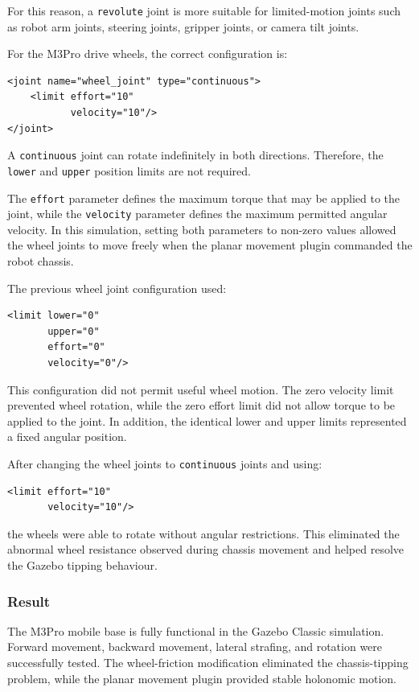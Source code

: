 \documentclass{article}
\begin{document}
For this reason, a \texttt{revolute} joint is more suitable for limited-motion joints such as robot arm joints, steering joints, gripper joints, or camera tilt joints.

For the M3Pro drive wheels, the correct configuration is:

\begin{verbatim}
<joint name="wheel_joint" type="continuous">
    <limit effort="10"
           velocity="10"/>
</joint>
\end{verbatim}

A \texttt{continuous} joint can rotate indefinitely in both directions. Therefore, the \texttt{lower} and \texttt{upper} position limits are not required.

The \texttt{effort} parameter defines the maximum torque that may be applied to the joint, while the \texttt{velocity} parameter defines the maximum permitted angular velocity. In this simulation, setting both parameters to non-zero values allowed the wheel joints to move freely when the planar movement plugin commanded the robot chassis.

The previous wheel joint configuration used:

\begin{verbatim}
<limit lower="0"
       upper="0"
       effort="0"
       velocity="0"/>
\end{verbatim}

This configuration did not permit useful wheel motion. The zero velocity limit prevented wheel rotation, while the zero effort limit did not allow torque to be applied to the joint. In addition, the identical lower and upper limits represented a fixed angular position.

After changing the wheel joints to \texttt{continuous} joints and using:

\begin{verbatim}
<limit effort="10"
       velocity="10"/>
\end{verbatim}

the wheels were able to rotate without angular restrictions. This eliminated the abnormal wheel resistance observed during chassis movement and helped resolve the Gazebo tipping behaviour.


\subsubsection{Result}

The M3Pro mobile base is fully functional in the Gazebo Classic simulation. Forward movement, backward movement, lateral strafing, and rotation were successfully tested. The wheel-friction modification eliminated the chassis-tipping problem, while the planar movement plugin provided stable holonomic motion.
\end{document}
